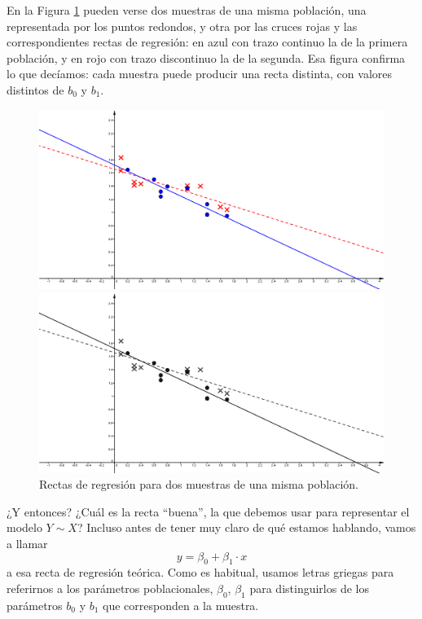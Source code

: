 En la Figura \ref{cap10:fig:RectasRegresionDosMuestras} pueden verse dos muestras de una misma
población, una representada por los puntos redondos, y otra por las cruces rojas y las
correspondientes rectas de regresión: en azul con trazo continuo la de la primera población, y en
rojo con trazo discontinuo la de la segunda. Esa figura confirma lo que decíamos: cada muestra
puede producir una recta distinta, con valores distintos de $b_0$ y $b_1$.

\begin{figure}[htbp]
\begin{center}
\begin{enColor}
\includegraphics[width=12.5cm]{../fig/Cap10-RegresionMuestrasDistintas.png}
\end{enColor}
\begin{bn}
\includegraphics[width=12.5cm]{../fig/Cap10-RegresionMuestrasDistintas-bn.png}
\end{bn}
\caption{Rectas de regresión para dos muestras de una misma población.}
\label{cap10:fig:RectasRegresionDosMuestras}
\end{center}
\end{figure}


¿Y entonces? ¿Cuál es la recta ``buena'', la que debemos usar para representar el modelo $Y \sim
X$? Incluso antes de tener muy claro de qué estamos hablando, vamos a llamar
    \begin{equation}\label{cap10:ecu:rectaRegresionPoblacional}
        y=\beta_0 +\beta_1\cdot x
    \end{equation}
a esa {\sf recta de regresión teórica}.  Como es habitual, usamos
letras griegas para referirnos a los parámetros poblacionales, $\beta_0$, $\beta_1$ para
distinguirlos de los parámetros $b_0$ y $b_1$ que corresponden a la muestra.

